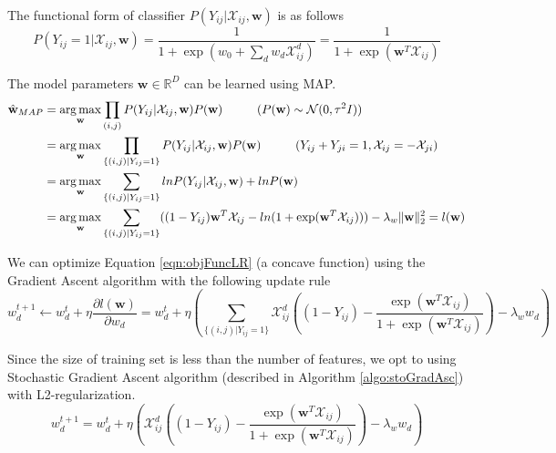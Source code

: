 	The functional form of classifier $P(Y_{ij}|\mathcal{X}_{ij}, \textbf{w})$ is as follows
		 \begin{equation}
		 P(Y_{ij}=1|\mathcal{X}_{ij}, \textbf{w}) = \frac{1}{1 + \exp ( w_0 + \sum_d w_d \mathcal{X}_{ij}^d )} = \frac{1}{1 + \exp (\textbf{w}^T \mathcal{X}_{ij})}
		 \end{equation}
	 
	The model parameters $\textbf{w} \in \mathbb{R}^D$ can be learned using MAP.
		\begin{align}
		\label{eqn:objFuncLR}
		\hat{\textbf{w}}_{MAP} &= \operatorname*{arg\,max}_{\textbf{w}} \prod_{(i,j)} P(Y_{ij}| \mathcal{X}_{ij}, \textbf{w}) P(\textbf{w}) \hspace{1 cm} \text{($P(\textbf{w}) \sim \mathcal{N} (0, \tau^2 I) $)}\\ \notag
		&= \operatorname*{arg\,max}_{\textbf{w}} \prod_{\{(i,j)|Y_{ij}=1\}} P(Y_{ij}| \mathcal{X}_{ij}, \textbf{w}) P(\textbf{w}) \hspace{1 cm} \text{($Y_{ij} + Y_{ji} = 1, \mathcal{X}_{ij} = - \mathcal{X}_{ji}$)}\\ \notag
		&= \operatorname*{arg\,max}_{\textbf{w}} \sum_{\{(i,j)|Y_{ij}=1\}} ln P(Y_{ij}| \mathcal{X}_{ij}, \textbf{w}) + ln P(\textbf{w}) \\ \notag
		&= \operatorname*{arg\,max}_{\textbf{w}} \sum_{\{(i,j)|Y_{ij}=1\}} ( (1 - Y_{ij})\textbf{w}^T\mathcal{X}_{ij} - ln(1 + \exp(\textbf{w}^T\mathcal{X}_{ij}))) - \lambda_w \|\textbf{w} \|^2_2 = l(\textbf{w})
		\end{align}

	We can optimize Equation \ref{eqn:objFuncLR} (a concave function) using the Gradient Ascent algorithm with the following update rule
		\begin{equation}
		w^{t+1}_d \leftarrow w^t_d + \eta \frac{\partial l(\textbf{w})}{\partial w_d} = w^t_d + \eta (\sum_{\{(i,j)|Y_{ij}=1\}} \mathcal{X}_{ij}^d ( (1 - Y_{ij}) - \frac{\exp(\textbf{w}^T\mathcal{X}_{ij})}{1 + \exp(\textbf{w}^T\mathcal{X}_{ij})})  - \lambda_w w_d)
		\end{equation}

	Since the size of training set is less than the number of features, we opt to using Stochastic Gradient Ascent algorithm (described in Algorithm \ref{algo:stoGradAsc}) with L2-regularization.
		\begin{equation}
		\label{eqn:stoGradAscUpdateFunc}
		w^{t+1}_d = w^t_d + \eta (\mathcal{X}_{ij}^d ( (1 - Y_{ij}) - \frac{\exp(\textbf{w}^T\mathcal{X}_{ij})}{1 + \exp(\textbf{w}^T\mathcal{X}_{ij})})  - \lambda_w w_d)
		\end{equation}

